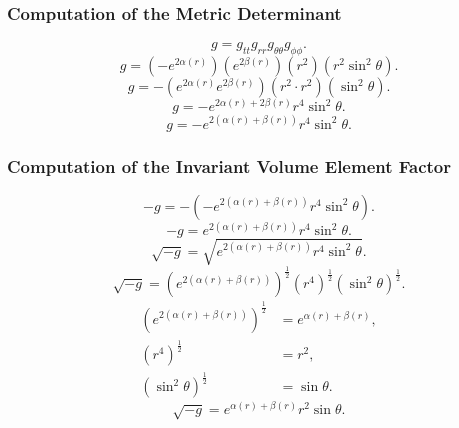 \documentclass[11pt, a4paper]{report}
\begin{document}
\subsubsection{Computation of the Metric Determinant}
\begin{equation}
g = g_{tt} g_{rr} g_{\theta\theta} g_{\phi\phi}.
\end{equation}
\begin{equation}
g = \left( -e^{2\alpha(r)} \right) \left( e^{2\beta(r)} \right) \left( r^2 \right) \left( r^2 \sin^2\theta \right).
\end{equation}
\begin{equation}
g = - \left( e^{2\alpha(r)} e^{2\beta(r)} \right) \left( r^2 \cdot r^2 \right) \left( \sin^2\theta \right).
\end{equation}
\begin{equation}
g = - e^{2\alpha(r) + 2\beta(r)} r^4 \sin^2\theta.
\end{equation}
\begin{equation}
g = - e^{2(\alpha(r) + \beta(r))} r^4 \sin^2\theta.
\end{equation}

\subsubsection{Computation of the Invariant Volume Element Factor}
\begin{equation}
-g = - \left( - e^{2(\alpha(r) + \beta(r))} r^4 \sin^2\theta \right).
\end{equation}
\begin{equation}
-g = e^{2(\alpha(r) + \beta(r))} r^4 \sin^2\theta.
\end{equation}
\begin{equation}
\sqrt{-g} = \sqrt{e^{2(\alpha(r) + \beta(r))} r^4 \sin^2\theta}.
\end{equation}
\begin{equation}
\sqrt{-g} = \left( e^{2(\alpha(r) + \beta(r))} \right)^{\frac{1}{2}} \left( r^4 \right)^{\frac{1}{2}} \left( \sin^2\theta \right)^{\frac{1}{2}}.
\end{equation}
\begin{align}
\left( e^{2(\alpha(r) + \beta(r))} \right)^{\frac{1}{2}} &= e^{\alpha(r) + \beta(r)}, \\
\left( r^4 \right)^{\frac{1}{2}} &= r^2, \\
\left( \sin^2\theta \right)^{\frac{1}{2}} &= \sin\theta.
\end{align}
\begin{equation}
\sqrt{-g} = e^{\alpha(r) + \beta(r)} r^2 \sin\theta.
\end{equation}
\end{document}
